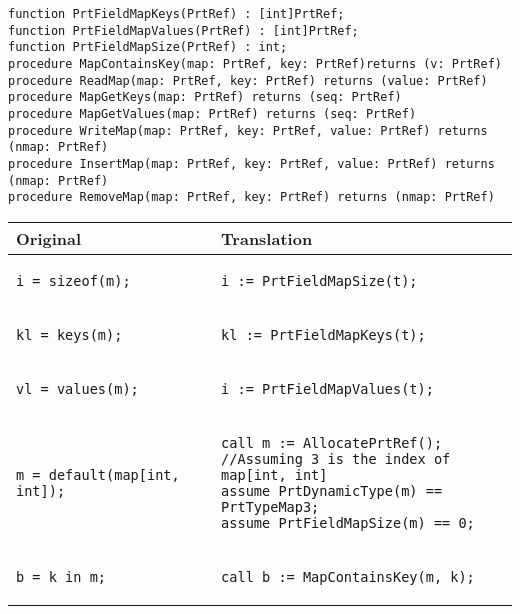 \documentclass{llncs}
\providecommand{\tabularnewline}{\\}
\begin{document}
\begin{verbatim}
function PrtFieldMapKeys(PrtRef) : [int]PrtRef;
function PrtFieldMapValues(PrtRef) : [int]PrtRef;
function PrtFieldMapSize(PrtRef) : int;
procedure MapContainsKey(map: PrtRef, key: PrtRef)returns (v: PrtRef)
procedure ReadMap(map: PrtRef, key: PrtRef) returns (value: PrtRef)
procedure MapGetKeys(map: PrtRef) returns (seq: PrtRef)
procedure MapGetValues(map: PrtRef) returns (seq: PrtRef)
procedure WriteMap(map: PrtRef, key: PrtRef, value: PrtRef) returns (nmap: PrtRef)
procedure InsertMap(map: PrtRef, key: PrtRef, value: PrtRef) returns (nmap: PrtRef)
procedure RemoveMap(map: PrtRef, key: PrtRef) returns (nmap: PrtRef)
\end{verbatim}

\pagebreak

\begin{center}
\begin{tabular}{|p{}|p{}|}
\hline
\textbf{Original} & \textbf{Translation}
\tabularnewline
\hline
\hline
\begin{verbatim}
i = sizeof(m);
\end{verbatim}
&
\begin{verbatim}
i := PrtFieldMapSize(t);
\end{verbatim}
\tabularnewline
\hline
\begin{verbatim}
kl = keys(m);
\end{verbatim}
&
\begin{verbatim}
kl := PrtFieldMapKeys(t);
\end{verbatim}
\tabularnewline
\hline

\begin{verbatim}
vl = values(m);
\end{verbatim}
&
\begin{verbatim}
i := PrtFieldMapValues(t);
\end{verbatim}
\tabularnewline
\hline

\begin{verbatim}
m = default(map[int, int]);
\end{verbatim}
&
\begin{verbatim}
call m := AllocatePrtRef();
//Assuming 3 is the index of map[int, int]
assume PrtDynamicType(m) == PrtTypeMap3;
assume PrtFieldMapSize(m) == 0;
\end{verbatim}
\tabularnewline
\hline

\begin{verbatim}
b = k in m;
\end{verbatim}
&
\begin{verbatim}
call b := MapContainsKey(m, k);
\end{verbatim}
\tabularnewline
\hline


\end{tabular}
\end{center}
\end{document}
